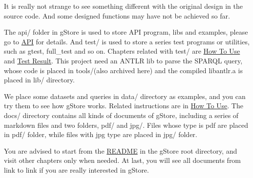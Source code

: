 \documentclass[titlepage, a4paper, 12pt]{article}
\begin{document}
It is really not strange to see something different with the original
design in the source code. And some designed functions may have not be
achieved so far.


The api/ folder in gStore is used to store API program, libs and
examples, please go to \hyperref[chapter05]{API} for details. And test/
is used to store a series test programs or utilities, such as gtest,
full\_test and so on. Chapters related with test/ are
\hyperref[chapter04]{How To Use} and \hyperref[chapter14]{Test Result}.
This project need an ANTLR lib to parse the SPARQL query, whose code is
placed in tools/(also archived here) and the compiled libantlr.a is
placed in lib/ directory.

We place some datasets and queries in data/ directory as examples, and
you can try them to see how gStore works. Related instructions are in
\hyperref[chapter04]{How To Use}. The docs/ directory contains all kinds
of documents of gStore, including a series of markdown files and two
folders, pdf/ and jpg/. Files whose type is pdf are placed in pdf/
folder, while files with jpg type are placed in jpg/ folder.

You are advised to start from the \hyperref[chapter00]{README} in the
gStore root directory, and visit other chapters only when needed. At
last, you will see all documents from link to link if you are really
interested in gStore.

\clearpage


\end{document}
